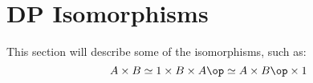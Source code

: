 

\section{DP Isomorphisms}

\begin{publictodo}
    This section will describe some of the isomorphisms, such as:
    \begin{equation}
        A \times B \simeq 1 \times B \times A\op \simeq A \times B\op \times 1
    \end{equation}
\end{publictodo}

